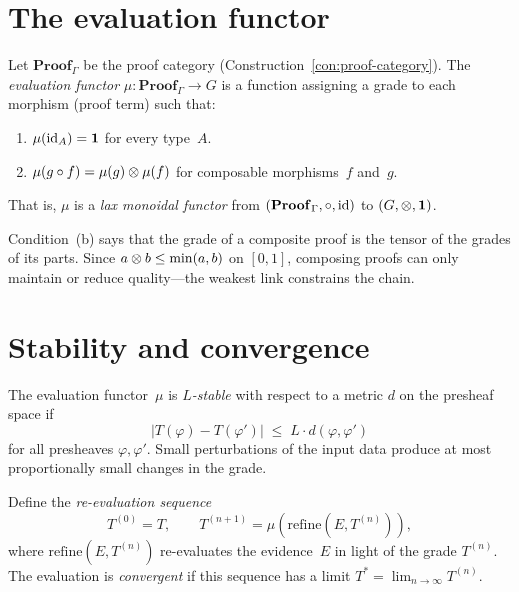 \section{The evaluation functor}
\label{sec:eval-functor}

\begin{definition}
\label{def:eval-functor}
Let $\mathbf{Proof}_\Gamma$ be the proof category
(Construction~\ref{con:proof-category}).
The \emph{evaluation functor}
$\mu : \mathbf{Proof}_\Gamma \to G$ is a function assigning a grade to
each morphism (proof term) such that:
\begin{enumerate}[label=(\alph*),nosep]
\item $\mu(\mathrm{id}_A) = \mathbf{1}$ for every type~$A$.
\item $\mu(g \circ f) = \mu(g) \otimes \mu(f)$ for composable
  morphisms~$f$ and~$g$.
\end{enumerate}
That is, $\mu$ is a \emph{lax monoidal functor} from
$(\mathbf{Proof}_\Gamma, \circ, \mathrm{id})$ to $(G, \otimes, \mathbf{1})$.
\end{definition}

\begin{remark}
Condition~(b) says that the grade of a composite proof is the tensor
of the grades of its parts.  Since $a \otimes b \leq \min(a,b)$ on
$[0,1]$, composing proofs can only maintain or reduce quality---the
weakest link constrains the chain.
\end{remark}

\section{Stability and convergence}
\label{sec:stability-convergence}

\begin{definition}[Stability]
\label{def:stability}
The evaluation functor~$\mu$ is \emph{$L$-stable} with respect to a
metric $d$ on the presheaf space if
\[
  |T(\varphi) - T(\varphi')| \;\leq\; L \cdot d(\varphi, \varphi')
\]
for all presheaves $\varphi, \varphi'$.  Small perturbations of the
input data produce at most proportionally small changes in the grade.
\end{definition}

\begin{definition}[Convergence]
\label{def:convergence}
Define the \emph{re-evaluation sequence}
\[
  T^{(0)} = T, \qquad
  T^{(n+1)} = \mu\!\left(\mathrm{refine}(E, T^{(n)})\right),
\]
where $\mathrm{refine}(E, T^{(n)})$ re-evaluates the evidence~$E$ in
light of the grade $T^{(n)}$.  The evaluation is \emph{convergent} if
this sequence has a limit $T^* = \lim_{n \to \infty} T^{(n)}$.
\end{definition}


